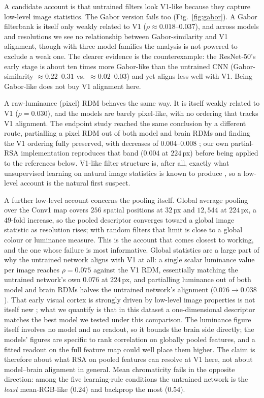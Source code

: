 \documentclass[10pt,twocolumn]{article}
\begin{document}
A candidate account is that untrained filters look V1-like because they capture low-level image statistics. The Gabor version fails too (Fig.~\ref{fig:gabor}). A Gabor filterbank is itself only weakly related to V1 ($\rho\approx0.018$--$0.037$), and across models and resolutions we see no relationship between Gabor-similarity and V1 alignment, though with three model families the analysis is not powered to exclude a weak one. The clearer evidence is the counterexample: the ResNet-50's early stage is about ten times more Gabor-like than the untrained CNN (Gabor-similarity $\approx0.22$--$0.31$ vs.\ $\approx0.02$--$0.03$) and yet aligns less well with V1. Being Gabor-like does not buy V1 alignment here.

A raw-luminance (pixel) RDM behaves the same way. It is itself weakly related to V1 ($\rho=0.030$), and the models are barely pixel-like, with no ordering that tracks V1 alignment. The endpoint study reached the same conclusion by a different route, partialling a pixel RDM out of both model and brain RDMs and finding the V1 ordering fully preserved, with decreases of $0.004$--$0.008$ \citep{leutenegger2026}; our own partial-RSA implementation reproduces that band ($0.004$ at $224$\,px) before being applied to the references below. V1-like filter structure is, after all, exactly what unsupervised learning on natural image statistics is known to produce \citep{olshausen1996}, so a low-level account is the natural first suspect.

A further low-level account concerns the pooling itself. Global average pooling over the Conv1 map covers $256$ spatial positions at $32$\,px and $12{,}544$ at $224$\,px, a $49$-fold increase, so the pooled descriptor converges toward a global image statistic as resolution rises; with random filters that limit is close to a global colour or luminance measure. This is the account that comes closest to working, and the one whose failure is most informative. Global statistics are a large part of why the untrained network aligns with V1 at all: a single scalar luminance value per image reaches $\rho = 0.075$ against the V1 RDM, essentially matching the untrained network's own $0.076$ at $224$\,px, and partialling luminance out of both model and brain RDMs halves the untrained network's alignment ($0.076 \to 0.038$). That early visual cortex is strongly driven by low-level image properties is not itself new \citep{goddard2020}; what we quantify is that in this dataset a one-dimensional descriptor matches the best model we tested under this comparison. The luminance figure itself involves no model and no readout, so it bounds the brain side directly; the models' figures are specific to rank correlation on globally pooled features, and a fitted readout on the full feature map could well place them higher. The claim is therefore about what RSA on pooled features can resolve at V1 here, not about model--brain alignment in general. Mean chromaticity fails in the opposite direction: among the five learning-rule conditions the untrained network is the \emph{least} mean-RGB-like ($0.24$) and backprop the most ($0.54$).
\end{document}
